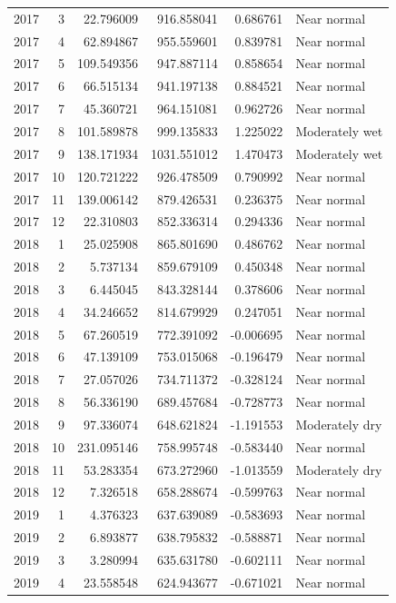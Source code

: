 \begin{tabular}{rrrrrl}
2017 & 3 & 22.796009 & 916.858041 & 0.686761 & Near normal \\
2017 & 4 & 62.894867 & 955.559601 & 0.839781 & Near normal \\
2017 & 5 & 109.549356 & 947.887114 & 0.858654 & Near normal \\
2017 & 6 & 66.515134 & 941.197138 & 0.884521 & Near normal \\
2017 & 7 & 45.360721 & 964.151081 & 0.962726 & Near normal \\
2017 & 8 & 101.589878 & 999.135833 & 1.225022 & Moderately wet \\
2017 & 9 & 138.171934 & 1031.551012 & 1.470473 & Moderately wet \\
2017 & 10 & 120.721222 & 926.478509 & 0.790992 & Near normal \\
2017 & 11 & 139.006142 & 879.426531 & 0.236375 & Near normal \\
2017 & 12 & 22.310803 & 852.336314 & 0.294336 & Near normal \\
2018 & 1 & 25.025908 & 865.801690 & 0.486762 & Near normal \\
2018 & 2 & 5.737134 & 859.679109 & 0.450348 & Near normal \\
2018 & 3 & 6.445045 & 843.328144 & 0.378606 & Near normal \\
2018 & 4 & 34.246652 & 814.679929 & 0.247051 & Near normal \\
2018 & 5 & 67.260519 & 772.391092 & -0.006695 & Near normal \\
2018 & 6 & 47.139109 & 753.015068 & -0.196479 & Near normal \\
2018 & 7 & 27.057026 & 734.711372 & -0.328124 & Near normal \\
2018 & 8 & 56.336190 & 689.457684 & -0.728773 & Near normal \\
2018 & 9 & 97.336074 & 648.621824 & -1.191553 & Moderately dry \\
2018 & 10 & 231.095146 & 758.995748 & -0.583440 & Near normal \\
2018 & 11 & 53.283354 & 673.272960 & -1.013559 & Moderately dry \\
2018 & 12 & 7.326518 & 658.288674 & -0.599763 & Near normal \\
2019 & 1 & 4.376323 & 637.639089 & -0.583693 & Near normal \\
2019 & 2 & 6.893877 & 638.795832 & -0.588871 & Near normal \\
2019 & 3 & 3.280994 & 635.631780 & -0.602111 & Near normal \\
2019 & 4 & 23.558548 & 624.943677 & -0.671021 & Near normal \\

\end{tabular}
